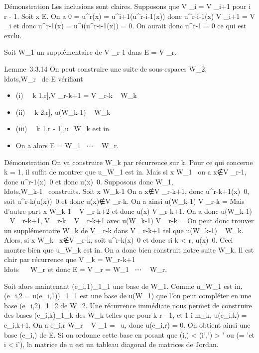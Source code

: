 \documentclass[]{article}
\begin{document}
Démonstration Les inclusions sont claires. Supposons que V \_i =
V \_i+1 pour i \leq r - 1. Soit x \in E. On a 0 = u^r(x) =
u^i+1(u^r-i-1(x)) donc u^r-i-1(x) \in V
\_i+1 = V \_i et donc u^r-1(x) =
u^i(u^r-i-1(x)) = 0. On aurait donc
u^r-1 = 0 ce qui est exclu.

Soit W\_1 un supplémentaire de V \_r-1 dans E = V
\_r.

Lemme~3.3.14 On peut construire une suite de sous-espaces
W\_2,\\ldots,W\_r~
de E vérifiant

\begin{itemize}
\itemsep1pt\parskip0pt
\item
  (i) \forall~~k \in {[}1,r{]},\quad V
  \_r-k+1 = V \_r-k \oplus~ W\_k
\item
  (ii) \forall~~k \in {[}2,r{]},\quad
  u(W\_k-1) \subset~ W\_k
\item
  (iii) \forall~~k \in {[}1,r -
  1{]},\quad u\textbar{}\_W\_k est
  in\jmathective
\item
  On a alors E = W\_1 \oplus~⋯ \oplus~
  W\_r.
\end{itemize}

Démonstration On va construire W\_k par récurrence sur k. Pour
ce qui concerne k = 1, il suffit de montrer que
u\textbar{}\_W\_1 est in\jmathective. Mais si x \in
W\_1 \diagdown\0\, on a
x∉V \_r-1, donc
u^r-1(x)\neq~0 et donc
u(x)\neq~0. Supposons donc
W\_1,\\ldots,W\_k-1~
construits. Soit x \in W\_k-1
\diagdown\0\. On a
x∉V \_r-k+1, donc
u^r-k+1(x)\neq~0, soit
u^r-k(u(x))\neq~0 et donc
u(x)∉V \_r-k. On a ainsi
u(W\_k-1) \bigcap V \_r-k =
\0\. Mais d'autre part x \in
W\_k-1 \subset~ V \_r-k+2 et donc u(x) \in V \_r-k+1. On
a donc u(W\_k-1) \subset~ V \_r-k+1, V \_r-k \subset~ V
\_r-k+1 avec u(W\_k-1) \bigcap V \_r-k =
\0\. On peut donc trouver un
supplémentaire W\_k de V \_r-k dans V \_r-k+1
tel que u(W\_k-1) \subset~ W\_k. Alors, si x \in W\_k
\diagdown\0\, x∉V
\_r-k, soit u^r-k(x)\neq~0 et
donc si k \textless{} r, u(x)\neq~0. Ceci montre
bien que u\textbar{}\_W\_k est in\jmathective. On a donc bien
construit notre suite W\_k. Il est clair par récurrence que V
\_k = W\_r-k+1
\oplus~\\ldots~ \oplus~
W\_r et donc E = V \_r = W\_1
\oplus~⋯ \oplus~ W\_r.

Soit alors maintenant (e\_i,1)\_1\leqi\leqs\_1 une
base de W\_1. Comme u\textbar{}\_W\_1 est
in\jmathective, (e\_i,2 =
u(e\_i,1))\_1\leqi\leqs\_1 est une base de
u(W\_1) que l'on peut compléter en une base
(e\_i,2)\_1\leqi\leqm\_2 de W\_2. Une
récurrence immédiate nous permet de construire des bases
(e\_i,k)\_1\leqi\leqm\_k des W\_k telles que
pour k \leq r - 1, et 1 \leq i \leq m\_k, u(e\_i,k) =
e\_i,k+1. On a e\_i,r \in W\_r \subset~ V \_1
= \mathrmKer~u, donc
u(e\_i,r) = 0. On obtient ainsi une base (e\_i,\jmath) de E.
Si on ordonne cette base en posant que (i,\jmath) \textless{} (i',\jmath')
\Leftrightarrow \jmath \textgreater{} \jmath'\text
ou (\jmath = \jmath'\text et i \textless{} i'), la matrice de
u est un tableau diagonal de matrices de Jordan.
\end{document}

